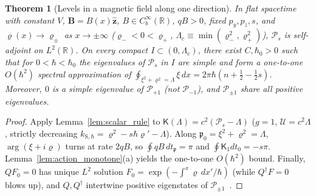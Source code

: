 \documentclass[aps,prd,onecolumn,tightenlines,nofootinbib,notitlepage,10pt,floatfix]{revtex4-2}
\theoremstyle{indentedtheorem}
\newtheorem{theorem}{Theorem}
\begin{document}
\begin{theorem}[Levels in a magnetic field along one direction]\label{thm:levels_B}
In flat spacetime with constant $V$, $\mathbf{B}=B(x)\hat{\mathbf{z}}$, $B\in C_b^\infty(\mathbb{R})$, $qB>0$, fixed $p_y,p_z,s$, and $\varrho(x)\to\varrho_\pm$ as $x\to\pm\infty$ ($\varrho_-<0<\varrho_+$, $\Lambda_c\equiv\min(\varrho_-^2,\varrho_+^2)$), $\mathcal{P}_s$ is self-adjoint on $L^2(\mathbb{R})$. On every compact $I\subset(0,\Lambda_c)$, there exist $C,\hbar_0>0$ such that for $0<\hbar<\hbar_0$ the eigenvalues of $\mathcal{P}_s$ in $I$ are simple and form a one-to-one $O(\hbar^2)$ spectral approximation of $\oint_{\xi^2+\varrho^2=\Lambda}\xi\,dx=2\pi\hbar(n+\tfrac{1}{2}-\tfrac{1}{2}s)$. Moreover, $0$ is a simple eigenvalue of $\mathcal{P}_{+1}$ (not $\mathcal{P}_{-1}$), and $\mathcal{P}_{\pm 1}$ share all positive eigenvalues.
\end{theorem}
\begin{proof}
Apply Lemma~\ref{lem:scalar_rule} to $\mathsf{K}(\Lambda)=c^2(\mathcal{P}_s-\Lambda)$ ($g=1$, $\mathcal{U}=c^2\Lambda$, strictly decreasing $k_{\text{S},\hbar}=\varrho^2-s\hbar\varrho'-\Lambda$). Along $\mathfrak{p}_0=\xi^2+\varrho^2=\Lambda$, $\arg(\xi+i\varrho)$ turns at rate $2qB$, so $\oint qB\,dt_\mathfrak{p}=\pi$ and $\oint\mathsf{K}_1 dt_0=-s\pi$. Lemma~\ref{lem:action_monotone}(a) yields the one-to-one $O(\hbar^2)$ bound. Finally, $QF_0=0$ has unique $L^2$ solution $F_0=\exp(-\int^x\varrho\,dx'/\hbar)$ (while $Q^\dagger F=0$ blows up), and $Q,Q^\dagger$ intertwine positive eigenstates of $\mathcal{P}_{\pm 1}$~\citep{CooperKhareSukhatme1995Supersymmetry}.
\end{proof}
\end{document}
